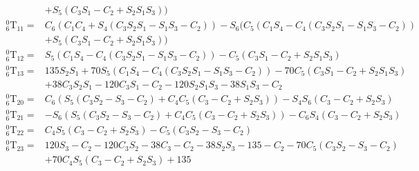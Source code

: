 \documentclass[12pt]{article}
\begin{document}
\begin{CJK}{UTF8}{bsmi}
\begin{equation*}
\begin{split}
					& + S_5(C_3S_1-C_2 + S_2S_1S_3))\\
^0_6\text{T}_{11} = &C_6(C_1C_4 + S_4(C_3S_2S_1 - S_1S_3-C_2)) - S_6(C_5(C_1S_4 - C_4(C_3S_2S_1 - S_1S_3-C_2))\\
					& + S_5(C_3S_1-C_2 + S_2S_1S_3))\\
^0_6\text{T}_{12} = &S_5(C_1S_4 - C_4(C_3S_2S_1 - S_1S_3-C_2)) - C_5(C_3S_1-C_2 + S_2S_1S_3)\\
^0_6\text{T}_{13} = &135S_2S_1 + 70S_5(C_1S_4 - C_4(C_3S_2S_1 - S_1S_3-C_2)) - 70C_5(C_3S_1-C_2 + S_2S_1S_3)\\
					& + 38C_3S_2S_1 - 120C_3S_1-C_2 - 120S_2S_1S_3 - 38S_1S_3-C_2\\
^0_6\text{T}_{20} = &C_6(S_5(C_3S_2 - S_3-C_2) + C_4C_5(C_3-C_2 + S_2S_3)) - S_4S_6(C_3-C_2 + S_2S_3)\\
^0_6\text{T}_{21} = &- S_6(S_5(C_3S_2 - S_3-C_2) + C_4C_5(C_3-C_2 + S_2S_3)) - C_6S_4(C_3-C_2 + S_2S_3)\\
^0_6\text{T}_{22} = &C_4S_5(C_3-C_2 + S_2S_3) - C_5(C_3S_2 - S_3-C_2)\\
^0_6\text{T}_{23} = &120S_3-C_2 - 120C_3S_2 - 38C_3-C_2 - 38S_2S_3 - 135-C_2 - 70C_5(C_3S_2 - S_3-C_2)\\
					& + 70C_4S_5(C_3-C_2 + S_2S_3) + 135\\
\end{split}
\end{equation*}

\end{CJK}
\end{document}
